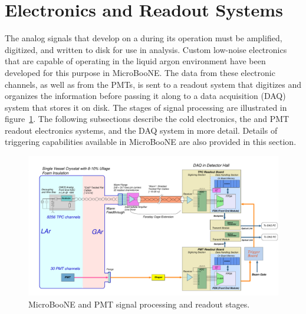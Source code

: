\section{Electronics and Readout Systems}
\label{sec:electronics}

The analog signals that develop on a \lartpc during its operation must be amplified, digitized, and written to disk for use in analysis.  Custom low-noise electronics that are capable of operating in the liquid argon environment have been developed for this purpose in MicroBooNE.  The data from these \lartpc electronic channels, as well as from the PMTs, is sent to a readout system that digitizes and organizes the information before passing it along to a data acquisition (DAQ) system that stores it on disk.  The stages of signal processing are illustrated in figure~\ref{readout_1}.  The following subsections describe the \lartpc cold electronics, the \lartpc and PMT readout electronics systems, and the DAQ system in more detail.  Details of triggering capabilities available in MicroBooNE are also provided in this section.

\begin{figure}
\centering
\includegraphics[width=0.95\linewidth]{./figures/MicroBooNEReadoutScheme.pdf}%
\caption{\label{readout_1}MicroBooNE \lartpc and PMT signal processing and readout stages.}
\end{figure}




